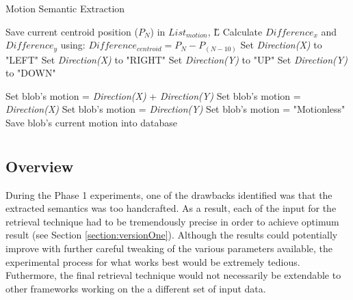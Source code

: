  \begin{algorithm}[H]
	\caption{Motion Semantic Extraction}
	\label{algo:motion}
	\begin{algorithmic}[1]
		\STATE Save current centroid position ($P_N$) in $List_{motion}$, \H{L}
		\STATE Calculate $Difference_x$ and $Difference_y$ using:
		\STATE $Difference_{centroid} = P_N -P_{(N-10)}$
		\STATE Set \textit{Direction(X)} to "LEFT"
		\ELSE
		\STATE Set \textit{Direction(X)} to "RIGHT"
		\ENDIF
		\ENDIF
		\STATE Set \textit{Direction(Y)} to "UP"
		\ELSE
		\STATE Set \textit{Direction(Y)} to "DOWN"
		\ENDIF
		\ENDIF

		\STATE Set blob's motion = \textit{Direction(X)} + \textit{Direction(Y)}
		\ELSE
		\STATE Set blob's motion = \textit{Direction(X) }
		\STATE Set blob's motion = \textit{Direction(Y)}
		\ELSE
		\STATE Set blob's motion = "Motionless"
		\ENDIF
		\ENDIF
		\ENDIF
		\STATE Save blob's current motion into database
		\ENDFOR
	\end{algorithmic}
\end{algorithm}



\section{\versionTwoExt }
\label{section:semantic_chamfer}

\subsection{Overview}

During the Phase 1 experiments, one of the drawbacks identified was that the extracted semantics was too handcrafted.
As a result, each of the input for the retrieval technique had to be tremendously precise in order to achieve optimum result (see Section \ref{section:versionOne}).
Although the results could potentially improve with further careful tweaking of the various parameters available, the experimental process for what works best would be extremely tedious.
Futhermore, the final retrieval technique would not necessarily be extendable to other frameworks working on the a different set of input data.

